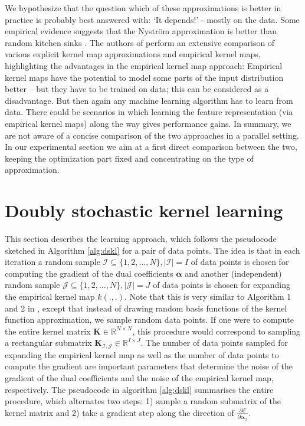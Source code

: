 \documentclass{article} %
\newcommand{\R}{\ensuremath{\mathds{R}}}
\newcommand{\va}{\boldsymbol{\alpha}}
\renewcommand{\vec}[1]{\mathbf{#1}}
\begin{document}
We hypothesize that the question which of these approximations is better in practice is probably best answered with: `It depends!' - mostly on the data. 
Some empirical evidence suggests that the Nystr\"om approximation is better than random kitchen sinks \cite{Yang2012}. The authors of \cite{Vedaldi2010} perform an extensive comparison of various explicit kernel map approximations and empirical kernel maps, highlighting the advantages in the empirical kernel map approach: Empirical kernel maps have the potential to model some parts of the input distribution better -- but they have to be trained on data; this can be considered as a disadvantage. But then again any machine learning algorithm has to learn from data. There could be scenarios in which learning the feature representation (via empirical kernel maps) along the way gives performance gains. In summary, we are not aware of a concise comparison of the two approaches in a parallel setting. In our experimental section we aim at a first direct comparison between the two, keeping the optimization part fixed and concentrating on the type of approximation. 
%
\section{Doubly stochastic kernel learning}\label{sec:dskl}
This section describes the learning approach, which follows the pseudocode sketched in Algorithm \autoref{alg:dskl} for a pair of data points. The idea is that in each iteration a random sample $\mathcal{I}\subseteq\{1,2,\dots,N\}, |\mathcal{I}|=I$ of data points is chosen for computing the gradient of the dual coefficients $\va$ and another (independent) random sample  $\mathcal{J}\subseteq\{1,2,\dots,N\}, |\mathcal{J}|=J$ of data points is chosen for expanding the empirical kernel map $k(.,.)$. Note that this is very similar to Algorithm 1 and 2 in \cite{Dai2014}, except that instead of drawing random basis functions of the kernel function approximation, we sample random data points. If one were to compute the entire kernel matrix $\vec{K}\in\R^{N\times N}$, this procedure would correspond to sampling a rectangular submatrix $\vec{K}_{\mathcal{I,J}}\in\R^{I\times J}$. The number of data points sampled for expanding the empirical kernel map as well as the number of data points to compute the gradient are important parameters that determine the noise of the gradient of the dual coefficients and the noise of the empirical kernel map, respectively. The pseudocode in algorithm \autoref{alg:dskl} summarises the entire procedure, which alternates two steps: 1) sample a random submatrix of the kernel matrix and 2) take a gradient step along the direction of $\frac{\partial\mathcal{E}}{\partial \va_{\mathcal{J}}}$.
\end{document}
